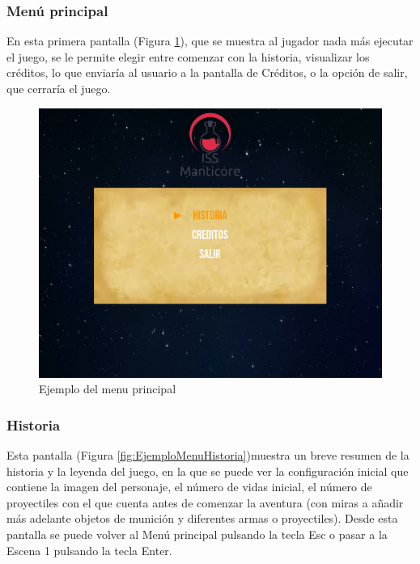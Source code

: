 \subsubsection{Menú principal}
En esta primera pantalla (Figura \ref{fig:EjemploMenuPrincipal}), que se muestra al jugador nada más ejecutar el juego, se le permite elegir entre comenzar con la historia, visualizar los créditos, lo que enviaría al usuario a la pantalla de Créditos, o la opción de salir, que cerraría el juego. 

\begin{figure}[H]
	\centering
	\includegraphics[scale=0.50]{imagenes/EjemploMenuPrincipal.png}
	\caption{\label{fig:EjemploMenuPrincipal}Ejemplo del menu principal}
\end{figure}

\subsubsection{Historia}
Esta pantalla (Figura \ref{fig:EjemploMenuHistoria})muestra un breve resumen de la historia y la leyenda del juego, en la que se puede ver la configuración inicial que contiene la imagen del personaje, el número de vidas inicial, el número de proyectiles con el que cuenta antes de comenzar la aventura (con miras a añadir más adelante objetos de munición y diferentes armas o proyectiles). Desde esta pantalla se puede volver al Menú principal pulsando la tecla Esc o pasar a la Escena 1 pulsando la tecla Enter. 

